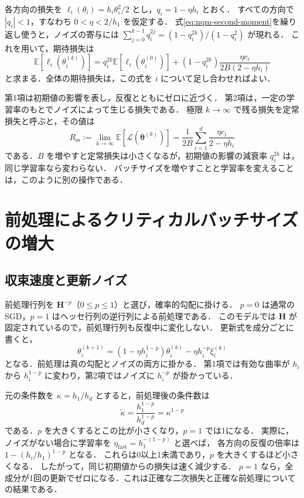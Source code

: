 \documentclass[../main.tex]{subfiles}
\begin{document}
各方向の損失を $\ell_i(\theta_i)=h_i\theta_i^2/2$ とし，$q_i=1-\eta h_i$ とおく．
すべての方向で $|q_i|<1$，すなわち $0<\eta<2/h_1$ を仮定する．
式\eqref{eq:nqm-second-moment}を繰り返し使うと，ノイズの寄与には
$\sum_{j=0}^{k-1}q_i^{2j}=(1-q_i^{2k})/(1-q_i^2)$ が現れる．
これを用いて，期待損失は
\begin{equation}
  \mathbb{E}[\ell_i(\theta_i^{(k)})]
  =q_i^{2k}\mathbb{E}[\ell_i(\theta_i^{(0)})]
  +(1-q_i^{2k})\frac{\eta c_i}{2B(2-\eta h_i)}
  \label{eq:nqm-risk}
\end{equation}
と求まる．全体の期待損失は，この式を $i$ について足し合わせればよい．

第1項は初期値の影響を表し，反復とともにゼロに近づく．
第2項は，一定の学習率のもとでノイズによって生じる損失である．
極限 $k\to\infty$ で残る損失を定常損失と呼ぶと，その値は
\begin{equation}
  R_{\mathrm{ss}}
  :=\lim_{k\to\infty}\mathbb{E}[\mathcal{L}(\bm{\theta}^{(k)})]
  =\frac{1}{2B}\sum_{i=1}^d\frac{\eta c_i}{2-\eta h_i}
  \label{eq:nqm-steady-risk}
\end{equation}
である．$B$ を増やすと定常損失は小さくなるが，初期値の影響の減衰率 $q_i^{2k}$ は，同じ学習率なら変わらない．
バッチサイズを増やすことと学習率を変えることは，このように別の操作である．

\section{前処理によるクリティカルバッチサイズの増大}
\label{sec:preconditioned-critical-batch}

\subsection{収束速度と更新ノイズ}

前処理行列を $\bm{H}^{-p}$（$0\leq p\leq1$）と選び，確率的勾配に掛ける．
$p=0$ は通常のSGD，$p=1$ はヘッセ行列の逆行列による前処理である．
このモデルでは $\bm{H}$ が固定されているので，前処理行列も反復中に変化しない．
更新式を成分ごとに書くと，
\begin{equation}
  \theta_i^{(k+1)}
  =(1-\eta h_i^{1-p})\theta_i^{(k)}
  -\eta h_i^{-p}\xi_i^{(k)}
  \label{eq:nqm-preconditioned-step}
\end{equation}
となる．前処理は真の勾配とノイズの両方に掛かる．
第1項では有効な曲率が $h_i$ から $h_i^{1-p}$ に変わり，第2項ではノイズに $h_i^{-p}$ が掛かっている．

元の条件数を $\kappa=h_1/h_d$ とすると，前処理後の条件数は
\begin{equation}
  \widetilde\kappa=\frac{h_1^{1-p}}{h_d^{1-p}}=\kappa^{1-p}
  \label{eq:nqm-condition-number}
\end{equation}
である．$p$ を大きくするとこの比が小さくなり，$p=1$ では1になる．
実際に，ノイズがない場合に学習率を $\eta_{\mathrm{fast}}=h_1^{-(1-p)}$ と選べば，
各方向の反復の倍率は $1-(h_i/h_1)^{1-p}$ となる．
これらは0以上1未満であり，$p$ を大きくするほど小さくなる．
したがって，同じ初期値からの損失は速く減少する．
$p=1$ なら，全成分が1回の更新でゼロになる．これは正確な二次損失と正確な前処理についての結果である．
\end{document}
